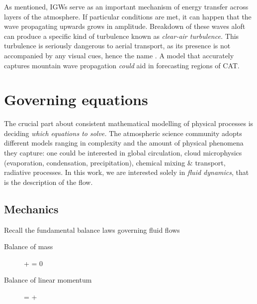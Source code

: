 \documentclass[../main.tex]{subfiles}
\begin{document}
As mentioned, IGWs serve as an important mechanism of energy transfer across layers of the atmosphere. If particular conditions are met, it can happen that the wave propagating upwards grows in amplitude. Breakdown of these waves aloft can produce a specific kind of turbulence known as \emph{clear-air turbulence.} This turbulence is seriously dangerous to aerial transport, as its presence is not accompanied by any visual cues, hence the name \autocite[p.~58]{nappoIntroductionAtmosphericGravity2013}. A model that accurately captures mountain wave propagation \emph{could} aid in forecasting regions of CAT. 


\section{Governing equations}
\label{sec:GOV-EQUATIONS}

The crucial part about consistent mathematical modelling of physical processes is deciding \emph{which equations to solve.} The atmospheric science community adopts different models ranging in complexity and the amount of physical phenomena they capture: one could be interested in \viz global circulation, cloud microphysics (evaporation, condensation, precipitation), chemical mixing \& transport, radiative processes. In this work, we are interested solely in \emph{fluid dynamics}, that is the description of the flow.

\subsection{Mechanics}
\label{sec:MECHANICS}

Recall the fundamental balance laws governing fluid flows

\begin{description}
	\item[Balance of mass]\mbox{}
	\begin{equations}[single,!,numberline=all]
	\label{eq:MASS-BALANCE}
	\tdot{\rho} + \rho \div {} = 0 \eqcomma
	\end{equations}
	\item[Balance of linear momentum]\mbox{}
	\begin{equations}[single,!,numberline=all]
	\label{eq:MOMENTUM-BALANCE}
	\rho {} = \div \cstress + \rho {} \eqend
	\end{equations}
\end{description}
\end{document}
